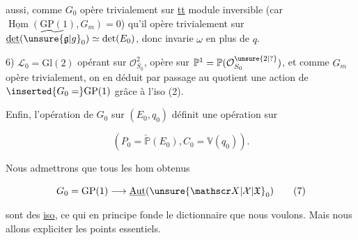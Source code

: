 aussi, comme $G_0$ opère trivialement sur \uline{tt} module inversible (car $\underline{\operatorname{Hom}}(\mathrm{GP}(1),G_m)=0$) qu'il opère trivialement sur $\underline{\det}(\widetilde{\unsure{\mathfrak g|g}}_0)\simeq\det(E_0)$, donc invarie $\omega$ en plus de $q$.

6) $\mathscr L_0=\mathrm{Gl}(2)$ opérant sur $\mathcal O_{S_0}^2$, opère sur $\mathbb P^1=\mathbb P(\mathcal O_{S_0}^{\unsure{2|?}})$, et comme $G_m$ opère trivialement, on en déduit par passage au quotient une action de $\inserted{G_0=}\mathrm{GP}(1)$ grâce à l'iso (2).

Enfin, l'opération de $G_0$ sur $(E_0,q_0)$ définit une opération sur

\[
(P_0=\check{\mathbb P}(E_0), C_0=\mathbb V(q_0)).
\]
\noindent\hspace*{.24\linewidth}

Nous admettrons  que tous les hom obtenus


\[
G_0=\mathrm{GP}(1)\longrightarrow\underline{\operatorname{Aut}}(\unsure{\mathscr X|\mathcal X|\mathfrak X}_0)\tag*{(7)}
\]

sont des \uline{iso}, ce qui en principe fonde le dictionnaire que nous voulons. Mais nous allons  expliciter  les points essentiels.

